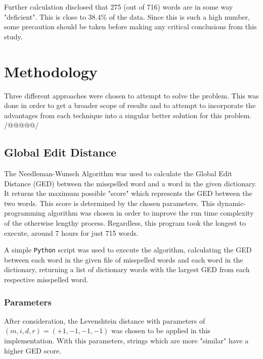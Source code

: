 \documentclass[11pt]{article}
\begin{document}
Further calculation disclosed that 275 (out of 716) words are in some way "deficient". This is close to 38.4\% of the data. Since this is such a high number, some precaution should be taken before making any critical conclusions from this study.




\section{Methodology}
Three different approaches were chosen to attempt to solve the problem. This was done in order to get a broader scope of results and to attempt to incorporate the advantages from each technique into a singular better solution for this problem. /@@@@@/



\subsection{Global Edit Distance}
The Needleman-Wunsch Algorithm %
was used to calculate the Global Edit Distance (GED) between the misspelled word and a word in the given dictionary. It returns the maximum possible "score" which represents the GED between the two words. This score is determined by the chosen parameters. This dynamic-programming algorithm was chosen in order to improve the run time complexity of the otherwise lengthy process. Regardless, this program took the longest to execute, around 7 hours for just 715 words. 

A simple \texttt{Python} script was used to execute the algorithm, calculating the GED between each word in the given file of misspelled words and each word in the dictionary, returning a list of dictionary words with the largest GED from each respective misspelled word.

\subsubsection{Parameters}
After consideration, the Levenshtein distance %
with parameters of \((m, i, d, r) = (+1, -1, -1, -1)\) was chosen to be applied in this implementation. With this parameters, strings which are more "similar" have a higher GED score. %
\end{document}
